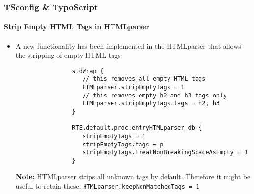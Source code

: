 \begin{frame}[fragile]
	\frametitle{TSconfig \& TypoScript}
	\framesubtitle{Strip Empty HTML Tags in HTMLparser}

	\lstset{basicstyle=\tiny\ttfamily}

	\begin{itemize}
		\item A new functionality has been implemented in the HTMLparser that allows the
			stripping of empty HTML tags

			\begin{lstlisting}
				stdWrap {
				   // this removes all empty HTML tags
				   HTMLparser.stripEmptyTags = 1
				   // this removes empty h2 and h3 tags only
				   HTMLparser.stripEmptyTags.tags = h2, h3
				}

				RTE.default.proc.entryHTMLparser_db {
				   stripEmptyTags = 1
				   stripEmptyTags.tags = p
				   stripEmptyTags.treatNonBreakingSpaceAsEmpty = 1
				}
			\end{lstlisting}

			\underline{\textbf{Note:}}
				HTMLparser strips all unknown tags by default.\newline
				Therefore it might be useful to retain these:\newline
				\texttt{HTMLparser.keepNonMatchedTags = 1}

	\end{itemize}

\end{frame}

